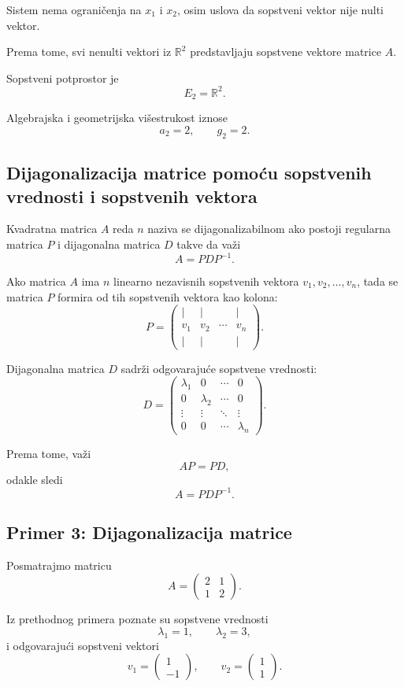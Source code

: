 \documentclass[12pt,a4paper]{report}
\begin{document}
Sistem nema ograničenja na $x_1$ i $x_2$, osim uslova
da sopstveni vektor nije nulti vektor.

Prema tome, svi nenulti vektori iz $\mathbb{R}^2$
predstavljaju sopstvene vektore matrice $A$.

Sopstveni potprostor je
\[
E_2=\mathbb{R}^2.
\]

Algebrajska i geometrijska višestrukost iznose
\[
a_2=2,\qquad g_2=2.
\]

\subsection{Dijagonalizacija matrice pomoću sopstvenih
	vrednosti i sopstvenih vektora}


Kvadratna matrica $A$ reda $n$ naziva se dijagonalizabilnom
ako postoji regularna matrica $P$ i dijagonalna matrica $D$
takve da važi
\[
\boxed{
	A=PDP^{-1}.
}
\]


Ako matrica $A$ ima $n$ linearno nezavisnih sopstvenih
vektora $v_1,v_2,\ldots,v_n$, tada se matrica $P$ formira
od tih sopstvenih vektora kao kolona:
\[
P=
\begin{pmatrix}
	| & | & & |\\
	v_1 & v_2 & \cdots & v_n\\
	| & | & & |
\end{pmatrix}.
\]

Dijagonalna matrica $D$ sadrži odgovarajuće sopstvene
vrednosti:
\[
D=
\begin{pmatrix}
	\lambda_1 & 0 & \cdots & 0\\
	0 & \lambda_2 & \cdots & 0\\
	\vdots & \vdots & \ddots & \vdots\\
	0 & 0 & \cdots & \lambda_n
\end{pmatrix}.
\]

Prema tome, važi
\[
AP=PD,
\]
odakle sledi
\[
\boxed{
	A=PDP^{-1}.
}
\]

\subsection{Primer 3: Dijagonalizacija matrice}

Posmatrajmo matricu
\[
A=
\begin{pmatrix}
	2 & 1\\
	1 & 2
\end{pmatrix}.
\]

Iz prethodnog primera poznate su sopstvene vrednosti
\[
\lambda_1=1,\qquad \lambda_2=3,
\]
i odgovarajući sopstveni vektori
\[
v_1=
\begin{pmatrix}
	1\\
	-1
\end{pmatrix},
\qquad
v_2=
\begin{pmatrix}
	1\\
	1
\end{pmatrix}.
\]
\end{document}
